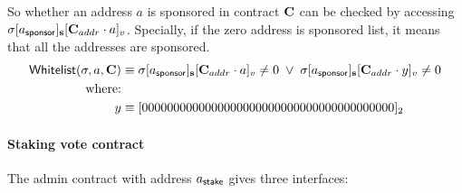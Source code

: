 So whether an address $a$ is sponsored in contract $\mathbf{C}$ can be checked by accessing $\mathbf{\sigma}[a_{\sf sponsor}]_{\bf s}[\mathbf{C}_{addr}\cdot a]_v$. Specially, if the zero address is sponsored list, it means that all the addresses are sponsored. 
\begin{align}
	\mathsf{Whitelist}(\mathbf{\sigma},a,\mathbf{C}) &\equiv \mathbf{\sigma}[a_{\sf sponsor}]_{\bf s}[\mathbf{C}_{addr}\cdot a]_v \neq 0 \;\vee\; \mathbf{\sigma}[a_{\sf sponsor}]_{\bf s}[\mathbf{C}_{addr}\cdot y]_v \neq 0 \notag \\
	\mbox{where:}&\notag \\
	y&\equiv [0000000000000000000000000000000000000000]_2 \label{eq:whitelist}
\end{align}

\paragraph{Staking vote contract}
The admin contract with address $a_{\sf stake}$ gives three interfaces:
